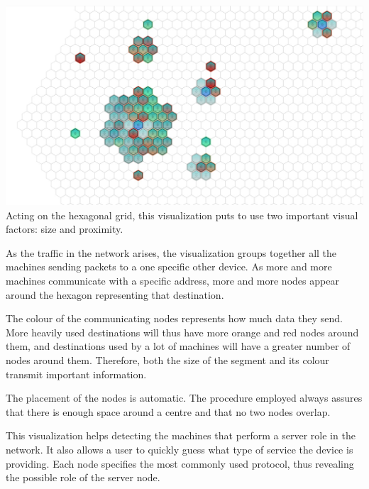 \includegraphics[width=\linewidth]{materials/groups.jpg}
Acting on the hexagonal grid, this visualization puts to use two important visual factors:
size and proximity.

As the traffic in the network arises, the visualization groups together all the machines
sending packets to a one specific other device. As more and more machines communicate with a specific
address, more and more nodes appear around the hexagon representing that destination.

The colour of the communicating nodes represents how much data they send. More heavily used destinations 
will thus have more orange and red nodes around them, and destinations used by a lot of machines will have a greater number of nodes around them. Therefore, both the size of the segment and its colour transmit important information.

The placement of the nodes is automatic. The procedure employed always assures that there is enough space around a centre
and that no two nodes overlap.

This visualization helps detecting the machines that perform a server role in the network.
It also allows a user to quickly guess what type of service the device is providing. Each node specifies the
most commonly used protocol, thus revealing the possible role of the server node.